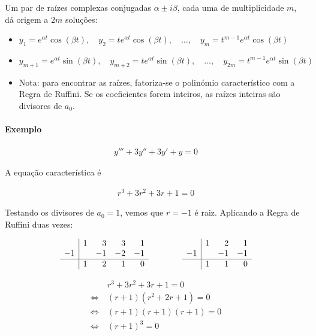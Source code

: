 \documentclass{article}
\begin{document}
Um par de raízes complexas conjugadas $\alpha \pm i \beta$, cada uma de multiplicidade $m$, dá origem a
$2m$ soluções:

\begin{itemize}
    \item $y_1 = e^{\alpha t} \cos(\beta t), \quad y_2 = t e^{\alpha t} \cos(\beta t), \quad \ldots, \quad
    y_m = t^{m-1} e^{\alpha t} \cos(\beta t)$
    \item $y_{m+1} = e^{\alpha t} \sin(\beta t), \quad y_{m+2} = t e^{\alpha t} \sin(\beta t), \quad \ldots, \quad
    y_{2m} = t^{m-1} e^{\alpha t} \sin(\beta t)$
\end{itemize}

\begin{itemize}
    \item Nota: para encontrar as raízes, fatoriza-se o polinómio característico com a Regra de Ruffini.
    Se os coeficientes forem inteiros, as raízes inteiras são divisores de $a_0$.
\end{itemize}

\paragraph{Exemplo}

\begin{gather*}
y''' + 3y'' + 3y' + y = 0
\end{gather*}

A equação característica é

\begin{gather*}
r^3 + 3r^2 + 3r + 1 = 0
\end{gather*}

Testando os divisores de $a_0 = 1$, vemos que $r = -1$ é raiz. Aplicando a Regra de Ruffini duas vezes:

\begin{gather*}
\begin{array}{r|rrrr}
   & 1 & 3  & 3  & 1  \\
-1 &   & -1 & -2 & -1 \\
\hline
   & 1 & 2  & 1  & 0
\end{array}
\qquad \qquad
\begin{array}{r|rrr}
   & 1 & 2  & 1  \\
-1 &   & -1 & -1 \\
\hline
   & 1 & 1  & 0
\end{array}
\end{gather*}

\begin{align*}
& r^3 + 3r^2 + 3r + 1 = 0 \\
\Leftrightarrow \ & (r + 1)(r^2 + 2r + 1) = 0 \\
\Leftrightarrow \ & (r + 1)(r + 1)(r + 1) = 0 \\
\Leftrightarrow \ & (r + 1)^3 = 0
\end{align*}
\end{document}

